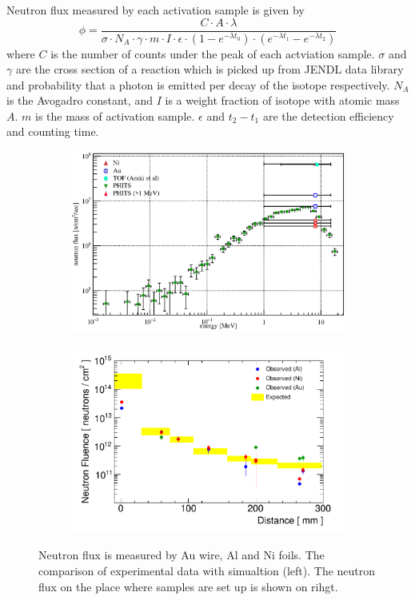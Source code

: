 Neutron flux measured by each activation sample is given by~\cite{nicholas}
\begin{equation}
 \phi = \frac{C \cdot A \cdot \lambda}{\sigma \cdot N_A \cdot \gamma \cdot m \cdot I \cdot \epsilon \cdot (1 - e^{-\lambda t_0}) \cdot (e^{-\lambda t_1} - e^{-\lambda t_2})}
\end{equation}
where $C$ is the number of counts under the peak of each actviation sample.
$\sigma$ and $\gamma$ are the cross section of a reaction which is picked up from JENDL data library and probability that a photon is emitted per decay of the isotope respectively.
$N_A$ is the Avogadro constant, and $I$ is a weight fraction of isotope with atomic mass $A$.
$m$ is the mass of activation sample.
$\epsilon$ and $t_2-t_1$ are the detection efficiency and counting time.
  \begin{figure}[H]
   \begin{subfigure}{0.3\textwidth}
   \centering
   \includegraphics[scale=0.45]{chapter4/fig/flux}
   \end{subfigure}
   \hspace{0.2\textwidth}
   \begin{subfigure}{0.3\textwidth}
   \centering
   \includegraphics[scale=0.48]{chapter4/fig/fluxtot.pdf}
   \end{subfigure}
   \caption{Neutron flux is measured by Au wire, Al and Ni foils. The comparison of experimental data with simualtion (left). The neutron flux on the place where samples are set up is shown on rihgt.}
   \label{3flux}
  \end{figure}

